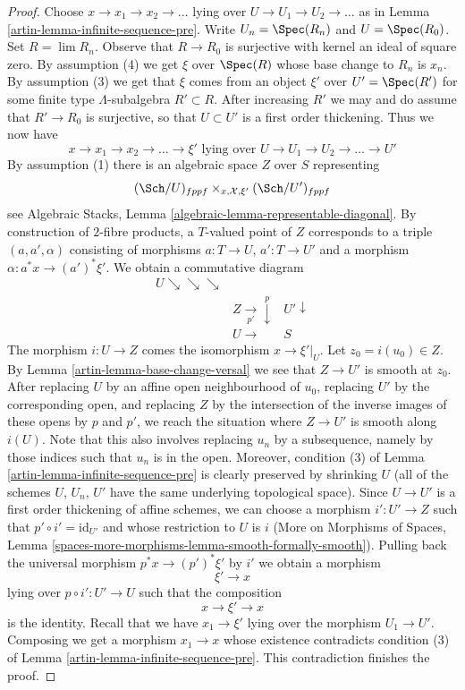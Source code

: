 \begin{proof}
\medskip\noindent
Choose $x \to x_1 \to x_2 \to \ldots$ lying over
$U \to U_1 \to U_2 \to \ldots$ as in Lemma \ref{artin-lemma-infinite-sequence-pre}.
Write $U_n = \Spec(R_n)$ and $U = \Spec(R_0)$.
Set $R = \lim R_n$. Observe that $R \to R_0$ is surjective
with kernel an ideal of square zero. By assumption (4)
we get $\xi$ over $\Spec(R)$ whose base change to $R_n$ is $x_n$.
By assumption (3) we get that $\xi$ comes from an object $\xi'$ over
$U' = \Spec(R')$ for some finite type $\Lambda$-subalgebra
$R' \subset R$. After increasing $R'$ we may and do assume that
$R' \to R_0$ is surjective, so that $U \subset U'$ is a first order thickening.
Thus we now have
$$
x \to x_1 \to x_2 \to \ldots \to \xi'
\text{ lying over }
U \to U_1 \to U_2 \to \ldots \to U'
$$
By assumption (1) there is an algebraic space $Z$ over $S$ representing
$$
(\Sch/U)_{fppf} \times_{x, \mathcal{X}, \xi'} (\Sch/U')_{fppf}
$$
see Algebraic Stacks, Lemma \ref{algebraic-lemma-representable-diagonal}.
By construction of $2$-fibre products, a $T$-valued point of $Z$
corresponds to a triple $(a, a', \alpha)$ consisting of morphisms
$a : T \to U$, $a' : T \to U'$ and a morphism $\alpha : a^*x \to (a')^*\xi'$.
We obtain a commutative diagram
$$
\begin{array}{ccc}U \searrow\searrow\searrow &  &  \\  & Z \underset{p'}{\longrightarrow}\overset{p}{\downarrow} & U' \downarrow \\  & U \longrightarrow & S\end{array}
$$
The morphism $i : U \to Z$ comes the isomorphism $x \to \xi'|_U$.
Let $z_0 = i(u_0) \in Z$. By Lemma \ref{artin-lemma-base-change-versal}
we see that $Z \to U'$ is smooth at $z_0$. After replacing $U$ by an
affine open neighbourhood of $u_0$, replacing $U'$ by the corresponding
open, and replacing $Z$ by the intersection of the inverse images
of these opens by $p$ and $p'$, we reach the situation where
$Z \to U'$ is smooth along $i(U)$. Note that this
also involves replacing $u_n$ by a subsequence, namely
by those indices such that $u_n$ is in the open. Moreover, condition
(3) of Lemma \ref{artin-lemma-infinite-sequence-pre}
is clearly preserved by shrinking $U$
(all of the schemes $U$, $U_n$, $U'$ have the same underlying
topological space).
Since $U \to U'$ is a first order thickening of affine schemes,
we can choose a morphism $i' : U' \to Z$
such that $p' \circ i' = \text{id}_{U'}$ and
whose restriction to $U$ is $i$
(More on Morphisms of Spaces, Lemma
\ref{spaces-more-morphisms-lemma-smooth-formally-smooth}).
Pulling back the universal morphism
$p^*x \to (p')^*\xi'$ by $i'$ we obtain a morphism
$$
\xi' \to x
$$
lying over $p \circ i' : U' \to U$ such that the composition
$$
x \to \xi' \to x
$$
is the identity. Recall that we have $x_1 \to \xi'$ lying over
the morphism $U_1 \to U'$. Composing we get a morphism
$x_1 \to x$ whose existence contradicts condition
(3) of Lemma \ref{artin-lemma-infinite-sequence-pre}.
This contradiction finishes the proof.
\end{proof}

